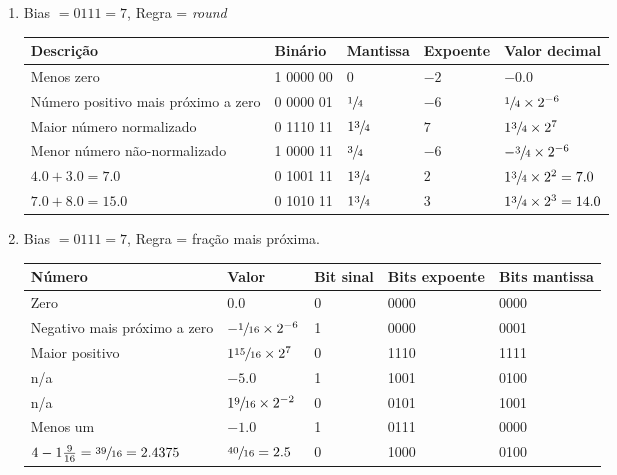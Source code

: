 \begin{enumerate}
    \item Bias $= 0111 = 7$, Regra = {\color{red}\textit{round}}
    \begin{table}[H]
        \begin{tabular}{|l|l|l|l|l|}
            \hline
            \textbf{Descrição}  &
            \textbf{Binário}    &
            \textbf{Mantissa}   &
            \textbf{Expoente}   &
            \textbf{Valor decimal} \\\hline
            Menos zero
            & 1 0000 00 & 0 & $-2$ & $-0.0$
            \\\hline
            Número positivo mais próximo a zero
            & 0 0000 01 & $\sfrac{1}{4}$ & $-6$ & $\sfrac{1}{4}\times 2^{-6}$
            \\\hline
            Maior número normalizado
            & 0 1110 11 & $1\sfrac{3}{4}$ & $7$ & $1\sfrac{3}{4}\times 2^7$
            \\\hline
            Menor número não-normalizado
            & 1 0000 11 & $\sfrac{3}{4}$ & $-6$ & $-\sfrac{3}{4}\times 2^{-6}$
            \\\hline
            $4.0 + 3.0 = 7.0$
            & 0 1001 11 & $1\sfrac{3}{4}$ & $2$ & $1\sfrac{3}{4}\times 2^2 = 7.0$
            \\\hline\rowcolor{red!25}
            $7.0 + 8.0 =  15.0$
            & 0 1010 11 & $1\sfrac{3}{4}$ & $3$ & $1\sfrac{3}{4}\times 2^3 = 14.0$
            \\\hline
        \end{tabular}
    \end{table}

    \item Bias $= 0111 = 7$, Regra = {\color{red}fração mais próxima}.
    \begin{table}[H]
        \begin{tabular}{|l|l|l|l|l|}
            \hline
            \textbf{Número}  &
            \textbf{Valor}    &
            \textbf{Bit sinal}   &
            \textbf{Bits expoente}   &
            \textbf{Bits mantissa} \\\hline
            Zero
            & $0.0$ & 0 & 0000 & 0000
            \\\hline
            Negativo mais próximo a zero
            & $-\sfrac{1}{16}\times 2^{-6}$ & 1 & 0000 & 0001
            \\\hline
            Maior positivo
            & $1\sfrac{15}{16}\times 2^7$ & 0 & 1110 & 1111
            \\\hline
            n/a & $-5.0$
            & 1 & 1001 & 0100
            \\\hline
            n/a & $1\sfrac{9}{16}\times2^{-2}$ 
            & 0 & 0101 & 1001
            \\\hline
            Menos um & $-1.0$
            & 1 & 0111 & 0000
            \\\hline\rowcolor{red!25}
            $4-1\frac{9}{16} = \sfrac{39}{16} = 2.4375$
            & $\sfrac{40}{16} = 2.5$ & 0 & 1000 & 0100 
            \\\hline
        \end{tabular}
    \end{table}


\end{enumerate}
